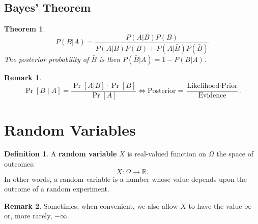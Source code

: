 \documentclass[12pt,openany]{book}
\newtheorem{theorem}{Theorem}[chapter]
\theoremstyle{definition}
\newtheorem{definition}{Definition}[chapter]
\newtheorem{remark}{Remark}[chapter]
\begin{document}
	\subsection{Bayes' Theorem}
	\begin{tcolorbox}[colback=white,colframe=thmcolor,arc=5pt,title={\color{white}\bf Bayes' Theorem}]
		\begin{theorem}
			\[
			P(B|A) = \frac{P(A|B)P(B)}{P(A|B)P(B)+P(A|\bar{B})P(\bar{B})}
			\] The posterior probability of $\bar{B}$ is then $P(\bar{B}|A)=1-P(B|A)$.
		\end{theorem}
	\end{tcolorbox}
	\begin{remark}
		\[
		\Pr[B\mid A]=\frac{\Pr[A|B]\cdot\Pr[B]}{\Pr[A]}\iff\text{Posterior}=\frac{\text{Likelihood}\cdot\text{Prior}}{\text{Evidence}}.
		\]
	\end{remark}
	
	\newpage
	\section{Random Variables}
	\begin{tcolorbox}[colframe=defcolor,title={\color{white}\bf Random Variable}]
		\begin{definition}
			A \textbf{random variable} $X$ is real-valued function on $\Omega$ the space of outcomes: \[
			X:\Omega\to\mathbb{R}.
			\] In other words, a random variable is a number whose value depends upon the outcome of a random experiment.
		\end{definition}
	\end{tcolorbox}
	\begin{remark}
		Sometimes, when convenient, we also allow $X$ to have the value $\infty$ or, more rarely, $-\infty$.
	\end{remark}
\end{document}

